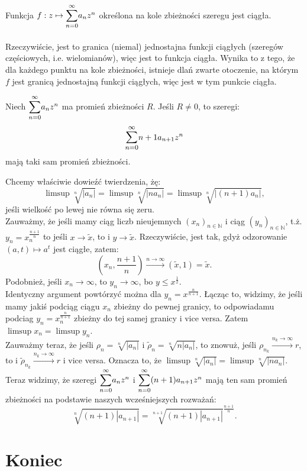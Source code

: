 \documentclass{article}
\numberwithin{defi}{section}
\numberwithin{defi}{section}
\newcommand{\N}{\mathbb{N}}
\newcommand{\oo}{\infty}
\providecommand{\half}{\frac{1}{2}}
\renewcommand{\leq}{\leqslant}
\newcommand{\bsumoo}[1]{\mathlarger{\sum_{#1 = 0}^{\oo}}}
\newcommand{\ciag}[1]{(#1_{n})_{n \in \N}}
\begin{document}
\begin{obs}{}
    Funkcja $f: z \mapsto \bsumoo{n} a_n z^n$ określona na kole zbieżności szeregu jest ciągła.
\end{obs}

\paragraph{} Rzeczywiście, jest to granica (niemal) jednostajna funkcji ciągłych (szeregów częściowych, i.e. wielomianów), więc jest to funkcja ciągła. Wynika to z tego, że dla każdego punktu na kole zbieżności, istnieje dlań zwarte otoczenie, na którym $f$ jest granicą jednostajną funkcji ciągłych, więc jest w tym punkcie ciągła.

\begin{twier}{}
    Niech $\bsumoo{n} a_n z^n$ ma promień zbieżności $R$. Jeśli $R \neq 0$, to szeregi: \begin{equation}
        \bsumoo{n} {n+1} a_{n+1} z^n
    \end{equation} mają taki sam promień zbieżności.
\end{twier}

\begin{dow}{}
    Chcemy właściwie dowieźć twierdzenia, żę: \begin{equation*}
        \limsup \sqrt[n]{|a_n|} = \limsup \sqrt[n]{|n a_n|} = \limsup \sqrt[n]{|(n+1) a_n|},
    \end{equation*} jeśli wielkość po lewej nie równa się zeru. \\
    Zauważmy, że jeśli mamy ciąg liczb nieujemnych $\ciag{x}$ i ciąg $\ciag{y}$, t.ż. $y_n = x_n ^{\frac{n+1}{n}}$ to jeśli $x \to \tilde{x}$, to i $y \to \tilde{x}$. Rzeczywiście, jest tak, gdyż odzorowanie $(a, t) \mapsto a ^ t$ jest ciągłe, zatem: \begin{equation*}
        (x_n, \frac{n + 1}{n}) \xrightarrow{n \to \oo} (\tilde{x}, 1) = \tilde{x}.
    \end{equation*} Podobnież, jeśli $x_n \to \oo$, to $y_n \to \oo$, bo $y \leq x ^ \half$. \\
    Identyczny argument powtórzyć można dla $y_n = x^{\frac{n}{n + 1}}$. Łącząc to, widzimy, że jeśli mamy jakiś podciąg ciągu $x_n$ zbieżny do pewnej granicy, to odpowiadamu podciag $y_n = x_n^{\frac{n}{n+1}}$ zbieżny do tej samej granicy i vice versa. Zatem $\limsup x_n = \limsup y_n$. \\
    Zauważmy teraz, że jeśli $\rho_n = \sqrt[n]{|a_n|}$ i $\tilde{\rho}_n = \sqrt[n]{n |a_n|}$, to znowuż, jeśli $\rho_{n_k} \xrightarrow{n_k \to \oo} r$, to i $\tilde{\rho}_{n_k} \xrightarrow{n_k \to \oo} r$ i vice versa. Oznacza to, że $\limsup \sqrt[n]{|a_n|} = \limsup \sqrt[n]{|n a_n|}$. \\
    Teraz widzimy, że szeregi $\bsumoo{n} a_n z^n$ i $\bsumoo{n} (n + 1) a_{n+1} z^n$ mają ten sam promień zbieżności na podstawie naszych wcześniejszych rozważań: \begin{equation*}
        \sqrt[n]{(n+1) |a_{n+1}|} = \sqrt[n+1]{(n+1) |a_{n+1}|} ^ \frac{n + 1}{n}.
    \end{equation*}
\end{dow}




\newpage
\section*{Koniec}
\newpage
\tableofcontents
\end{document}
